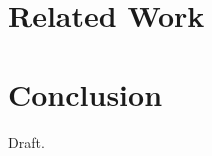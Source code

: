 \documentclass[letterpaper,twocolumn,10pt]{article}
\begin{document}


\section{Related Work}
\label{sec:rw}



\section{Conclusion}
\label{sec:concl}

Draft.



{\footnotesize 
}
\end{document}
